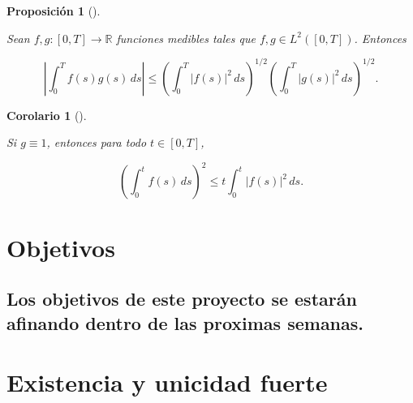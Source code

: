 \documentclass[
  spanish,
  us-letterpaper,
]{scrreprt}
\theoremstyle{plain}
\newtheorem{corollary}{Corolario}[chapter]
\theoremstyle{plain}
\newtheorem{proposition}{Proposición}[chapter]
\theoremstyle{definition}
\theoremstyle{plain}
\theoremstyle{remark}
\begin{document}
\begin{proposition}[]\protect\hypertarget{prp-des_cauchy_schwarz}{}\label{prp-des_cauchy_schwarz}

Sean \(f, g: [0, T] \to \mathbb{R}\) funciones medibles tales que
\(f, g \in L^2([0, T])\). Entonces

\[
\left| \int_0^T f(s) g(s) \, ds \right| \leq \left( \int_0^T |f(s)|^2 \, ds \right)^{1/2} \left( \int_0^T |g(s)|^2 \, ds \right)^{1/2}.
\]

\end{proposition}

\begin{corollary}[]\protect\hypertarget{cor-cauchy_schwarz}{}\label{cor-cauchy_schwarz}

Si \(g \equiv 1\), entonces para todo \(t \in [0, T]\),

\[
\left( \int_0^t f(s) \, ds \right)^2 \leq t \int_0^t |f(s)|^2 \, ds.
\]

\end{corollary}


\chapter{Objetivos}\label{objetivos}

\section{Los objetivos de este proyecto se estarán afinando dentro de
las proximas
semanas.}\label{los-objetivos-de-este-proyecto-se-estaruxe1n-afinando-dentro-de-las-proximas-semanas.}


\chapter{Existencia y unicidad
fuerte}\label{existencia-y-unicidad-fuerte}
\end{document}
